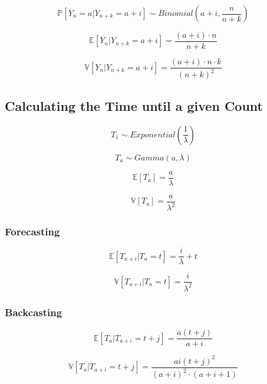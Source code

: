 \begin{equation}
    \mathbb{P}[Y_n = a | Y_{n + k} = a + i ] 
    \sim Binomial\left(a + i, \frac{n}{n+k}\right)
\end{equation}

\begin{equation}
    \mathbb{E}[Y_n | Y_{n + k} = a + i ] =
    \frac{(a + i) \cdot n}{n+k}
\end{equation}

\begin{equation}
    \mathbb{V}[Y_n | Y_{n + k} = a + i ] = 
    \frac{(a + i) \cdot n \cdot k}{(n + k)^2}
\end{equation}

\subsection{Calculating the Time until a given Count}

\begin{equation}
    T_1 \sim Exponential\left(\frac{1}{\lambda}\right)
\end{equation}

\begin{equation}
    T_a \sim Gamma(a, \lambda)
\end{equation}

\begin{equation}
    \mathbb{E}[T_a] = \frac{a}{\lambda}
\end{equation}

\begin{equation}
    \mathbb{V}[T_a] = \frac{a}{\lambda^2}
\end{equation}

\subsubsection{Forecasting}
\begin{equation}
    \mathbb{E}[T_{a + i} | T_a = t] = \frac{i}{\lambda} + t
\end{equation}

\begin{equation}
    \mathbb{V}[T_{a + i} | T_a = t] = \frac{i}{\lambda^2}
\end{equation}


\subsubsection{Backcasting}
\begin{equation}
    \mathbb{E}[T_a | T_{a + i} = t + j] = \frac{a(t + j)}{a + i}
\end{equation}

\begin{equation}
    \mathbb{V}[T_a | T_{a + i} = t + j] = 
    \frac{ ai(t + j)^2 }{ (a + i)^2 \cdot (a + i + 1) }
\end{equation}
